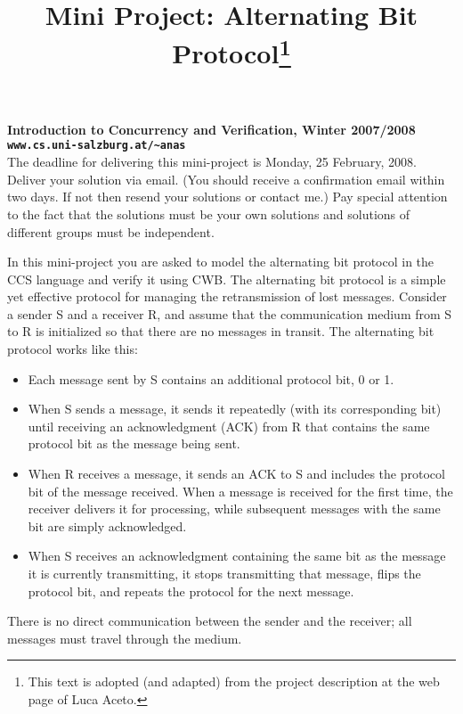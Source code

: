 \documentclass{article}
\title{Mini Project: Alternating Bit Protocol\footnote{This text is
adopted (and adapted) from the project description at the web page
of Luca Aceto.}}
\begin{document}
\maketitle

{\bf{Introduction to Concurrency and Verification, Winter
2007/2008\\

 \hspace*{3cm}\tt{www.cs.uni-salzburg.at/\~{ }anas}}}\\



The deadline for delivering this mini-project is Monday, 25
February, 2008. Deliver your solution via email. (You should receive
a confirmation email within two days. If not then resend your
solutions or contact me.) Pay special attention to the fact that the
solutions must be your own solutions and solutions of different
groups must be independent.

In this mini-project you are asked to model the alternating bit
protocol in the CCS language and verify it using CWB. The
alternating bit protocol is a simple yet effective protocol for
managing the retransmission of lost messages. Consider a sender S
and a receiver R, and assume that the communication medium from S to
R is initialized so that there are no messages in transit. The
alternating bit protocol works like this:

\begin{itemize}
\item Each message sent by S contains an additional protocol bit, 0
or 1.
\item When S sends a message, it sends it repeatedly (with its
corresponding bit) until receiving an acknowledgment (ACK) from R
that contains the same protocol bit as the message being sent.
\item When R receives a message, it sends an ACK to S and includes the
protocol bit of the message received. When a message is received for
the first time, the receiver delivers it for processing, while
subsequent messages with the same bit are simply acknowledged.
\item
When S receives an acknowledgment containing the same bit as the
message it is currently transmitting, it stops transmitting that
message, flips the protocol bit, and repeats the protocol for the
next message.
\end{itemize}

There is no direct communication between the sender and the
receiver; all messages must travel through the medium.
\end{document}
